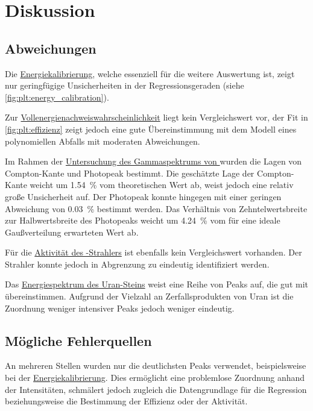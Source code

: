 \section{Diskussion}
\label{sec:diskussion}

\subsection{Abweichungen}
Die \hyperref[sec:auswertung:energiekalibrierung]{Energiekalibrierung},
    welche essenziell für die weitere Auswertung ist,
zeigt nur geringfügige Unsicherheiten in der Regressionsgeraden (siehe \autoref{fig:plt:energy_calibration}).

Zur \hyperref[sec:auswertung:effizienz]{Vollenergienachweiswahrscheinlichkeit} liegt kein Vergleichswert vor,
der Fit in \autoref{fig:plt:effizienz} zeigt jedoch eine gute Übereinstimmung mit dem Modell eines polynomiellen Abfalls mit moderaten Abweichungen.

Im Rahmen der \hyperref[sec:auswertung:Cs_137]{Untersuchung des Gammaspektrums von }
wurden die Lagen von Compton-Kante und Photopeak bestimmt.
Die geschätzte Lage der Compton-Kante weicht um \SI{1.54}{\percent} vom theoretischen Wert ab,
weist jedoch eine relativ große Unsicherheit auf.
Der Photopeak konnte hingegen mit einer geringen Abweichung von \SI{0.03}{\percent} bestimmt werden.
Das Verhältnis von Zehntelwertsbreite zur Halbwertsbreite des Photopeaks
weicht um \SI{4.24}{\percent} vom für eine ideale Gaußverteilung erwarteten Wert ab.

Für die \hyperref[sec:auswertung:Ba_133]{Aktivität des -Strahlers} ist ebenfalls kein Vergleichswert vorhanden.
Der Strahler konnte jedoch in Abgrenzung zu  eindeutig identifiziert werden.

Das \hyperref[sec:auswertung:uranstein]{Energiespektrum des Uran-Steins} weist eine Reihe von Peaks auf,
die gut mit  übereinstimmen.
Aufgrund der Vielzahl an Zerfallsprodukten von Uran ist die Zuordnung weniger intensiver Peaks jedoch weniger eindeutig.


\subsection{Mögliche Fehlerquellen}
An mehreren Stellen wurden nur die deutlichsten Peaks verwendet,
beispielsweise bei der \hyperref[sec:auswertung:energiekalibrierung]{Energiekalibrierung}.
Dies ermöglicht eine problemlose Zuordnung anhand der Intensitäten,
schmälert jedoch zugleich die Datengrundlage für die Regression beziehungsweise die Bestimmung der Effizienz oder der Aktivität.

